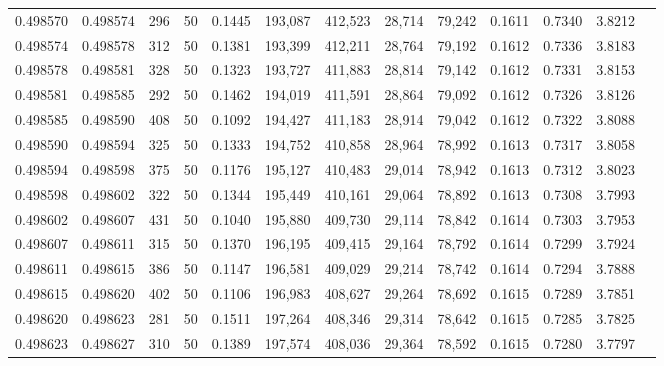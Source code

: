 \begin{tabular}{rrrrrrrrrrrrr}
0.498570 & 0.498574 & 296 &  50 &                                     0.1445 & 193,087 & 412,523 &  28,714 &  79,242 & 0.1611 & 0.7340 & 3.8212 \\
0.498574 & 0.498578 & 312 &  50 &                                     0.1381 & 193,399 & 412,211 &  28,764 &  79,192 & 0.1612 & 0.7336 & 3.8183 \\
0.498578 & 0.498581 & 328 &  50 &                                     0.1323 & 193,727 & 411,883 &  28,814 &  79,142 & 0.1612 & 0.7331 & 3.8153 \\
0.498581 & 0.498585 & 292 &  50 &                                     0.1462 & 194,019 & 411,591 &  28,864 &  79,092 & 0.1612 & 0.7326 & 3.8126 \\
0.498585 & 0.498590 & 408 &  50 &                                     0.1092 & 194,427 & 411,183 &  28,914 &  79,042 & 0.1612 & 0.7322 & 3.8088 \\
0.498590 & 0.498594 & 325 &  50 &                                     0.1333 & 194,752 & 410,858 &  28,964 &  78,992 & 0.1613 & 0.7317 & 3.8058 \\
0.498594 & 0.498598 & 375 &  50 &                                     0.1176 & 195,127 & 410,483 &  29,014 &  78,942 & 0.1613 & 0.7312 & 3.8023 \\
0.498598 & 0.498602 & 322 &  50 &                                     0.1344 & 195,449 & 410,161 &  29,064 &  78,892 & 0.1613 & 0.7308 & 3.7993 \\
0.498602 & 0.498607 & 431 &  50 &                                     0.1040 & 195,880 & 409,730 &  29,114 &  78,842 & 0.1614 & 0.7303 & 3.7953 \\
0.498607 & 0.498611 & 315 &  50 &                                     0.1370 & 196,195 & 409,415 &  29,164 &  78,792 & 0.1614 & 0.7299 & 3.7924 \\
0.498611 & 0.498615 & 386 &  50 &                                     0.1147 & 196,581 & 409,029 &  29,214 &  78,742 & 0.1614 & 0.7294 & 3.7888 \\
0.498615 & 0.498620 & 402 &  50 &                                     0.1106 & 196,983 & 408,627 &  29,264 &  78,692 & 0.1615 & 0.7289 & 3.7851 \\
0.498620 & 0.498623 & 281 &  50 &                                     0.1511 & 197,264 & 408,346 &  29,314 &  78,642 & 0.1615 & 0.7285 & 3.7825 \\
0.498623 & 0.498627 & 310 &  50 &                                     0.1389 & 197,574 & 408,036 &  29,364 &  78,592 & 0.1615 & 0.7280 & 3.7797 \\

\end{tabular}
